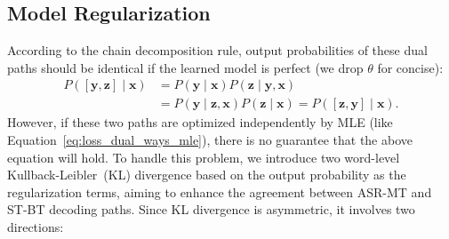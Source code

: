 \documentclass[letterpaper]{article} %
\begin{document}
\subsection*{Model Regularization}
According to the chain decomposition rule, output probabilities of these dual paths should be identical if the learned model is perfect (we drop $\theta$ for concise):
  \begin{equation}
        \begin{aligned}
            P\left([\mathbf{y},\mathbf{z}]\mid \mathbf{x}\right) & =  P\left( \mathbf{y} \mid \mathbf{x}\right) P\left( \mathbf{z} \mid \mathbf{y}, \mathbf{x}\right) \\
            & = P\left( \mathbf{y} \mid \mathbf{z}, \mathbf{x} \right) P\left( \mathbf{z} \mid \mathbf{x} \right) = P\left([\mathbf{z},\mathbf{y}] \mid \mathbf{x} \right).
        \end{aligned}
        \label{eq:agreement}
    \end{equation}
However, if these two paths are optimized independently by MLE (like Equation~\ref{eq:loss_dual_ways_mle}), there is no guarantee that the above equation will hold. 
To handle this problem, we introduce two word-level Kullback-Leibler~(KL) divergence based on the output probability as the regularization terms, aiming to enhance the agreement between ASR-MT and ST-BT decoding paths.
Since KL divergence is asymmetric, it involves two directions:
\end{document}
